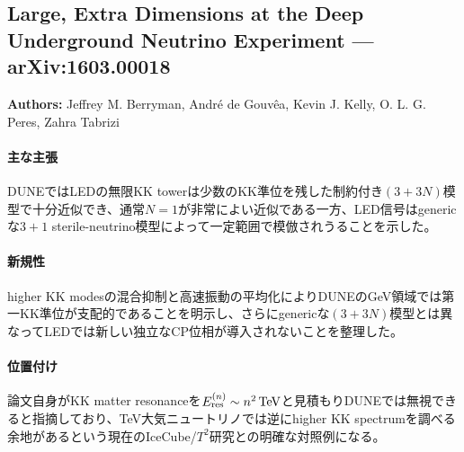 \subsection{Large, Extra Dimensions at the Deep Underground Neutrino Experiment --- arXiv:1603.00018}

\textbf{Authors:} Jeffrey M. Berryman, Andr\'e de Gouv\^ea, Kevin J. Kelly, O. L. G. Peres, Zahra Tabrizi

\paragraph{主な主張}
DUNEではLEDの無限KK towerは少数のKK準位を残した制約付き$(3+3N)$模型で十分近似でき、通常$N=1$が非常によい近似である一方、LED信号はgenericな$3+1$ sterile-neutrino模型によって一定範囲で模倣されうることを示した\cite{Berryman:2016DUNELED}。

\paragraph{新規性}
higher KK modesの混合抑制と高速振動の平均化によりDUNEのGeV領域では第一KK準位が支配的であることを明示し、さらにgenericな$(3+3N)$模型とは異なってLEDでは新しい独立なCP位相が導入されないことを整理した。

\paragraph{位置付け}
論文自身がKK matter resonanceを$E_{\rm res}^{(n)}\sim n^2\,{\rm TeV}$と見積もりDUNEでは無視できると指摘しており、TeV大気ニュートリノでは逆にhigher KK spectrumを調べる余地があるという現在のIceCube/$T^2$研究との明確な対照例になる。
